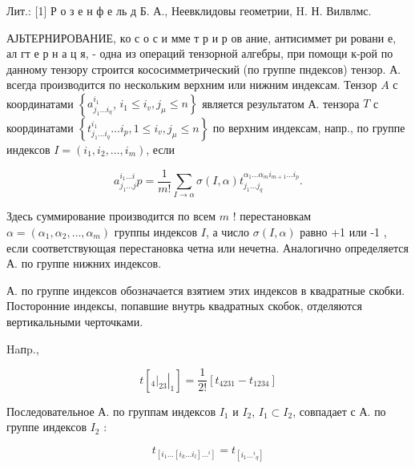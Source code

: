 \documentclass[10pt]{article}
\begin{document}
Лит.: [1] Р о з е н ф е ль д Б. А., Неевклидовы геометрии, H. Н. Вилвлмс.



АЈЬТЕРНИРОВАНИЕ, $\boldsymbol{к} о$ с о с и мме т р и р ов ание, антисиммет ри ровани е, ал гт е р н а ц я, - одна из операций тензорной алгебры, при помощи к-рой по данному тензору строится кососимметрический (по группе пндексов) тензор. А. всегда производится по нескольким верхним или нижним индексам. Тензор $A$ с координатами $\left\{a_{j_{1} \ldots i_{\eta}}^{i_{1}}\right.$, $\left.i_{1} \leqslant i_{v}, j_{\mu} \leqslant n\right\}$ является результатом А. тензора $T$ с координатами $\left\{t_{j_{1} \ldots i_{q}}^{i_{1}} \ldots i_{p}, 1 \leqslant i_{v}, j_{\mu} \leqslant n\right\}$ по верхним индексам, напр., по группе индексов $I=\left(i_{1}, i_{2}, \ldots, i_{m}\right)$, если



\[

a_{j_{1} \ldots j}^{i_{1} \ldots i} p=\frac{1}{m !} \sum_{I \rightarrow \alpha} \sigma(I, \alpha) t_{j_{1} \ldots j_{q}}^{\alpha_{1} \ldots \alpha_{m} i_{m+1} \ldots i_{p}} .

\]



Здесь суммирование производится по всем $m$ ! перестановкам $\alpha=\left(\alpha_{1}, \alpha_{2}, \ldots, \alpha_{m}\right)$ группы индексов $I$, а число $\sigma(I, \alpha)$ равно +1 или -1 , если соответствующая перестановка четна или нечетна. Аналогично определяется А. по группе нижних индексов.



А. по группе индексов обозначается взятием этих индексов в квадратные скобки. Посторонние индексы, попавшие внутрь квадратных скобок, отделяются вертикальными черточками.



Haпp.,



\[

t\left[\left.\left.{ }_{4}\right|_{23}\right|_{1}\right]=\frac{1}{2 !}\left[t_{4231}-t_{1234}\right]

\]



Последовательное А. по группам индексов $I_{1}$ и $I_{2}$, $I_{1} \subset I_{2}$, совпадает с А. по группе индексов $I_{2}$ :



\[

t_{\left[i_{1} \ldots\left[i_{k} \ldots i_{l}\right] \ldots{ }^{i}\right]}=t_{\left[i_{1} \ldots{ }^{i}{ }_{q}\right]}

\]
\end{document}
